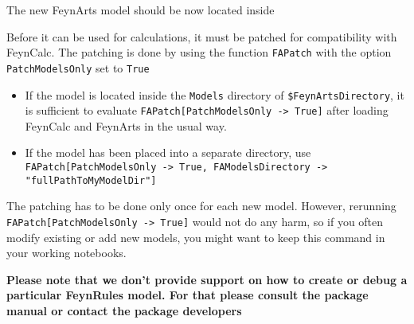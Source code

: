 \documentclass[../FeynCalcManual.tex]{subfiles}
\begin{document}
The new FeynArts model should be now located inside

\begin{Shaded}
\begin{Highlighting}[]
\OperatorTok{[\{}\OperatorTok{,}\OperatorTok{,}\OperatorTok{,}\OperatorTok{,}\OperatorTok{\}]}
\end{Highlighting}
\end{Shaded}

Before it can be used for calculations, it must be patched for
compatibility with FeynCalc. The patching is done by using the function
\texttt{FAPatch} with the option \texttt{PatchModelsOnly} set to
\texttt{True}

\begin{itemize}
\tightlist
\item
  If the model is located inside the \texttt{Models} directory of
  \texttt{\$FeynArtsDirectory}, it is sufficient to evaluate
  \texttt{FAPatch[\allowbreak{}PatchModelsOnly -> True]} after loading
  FeynCalc and FeynArts in the usual way.
\item
  If the model has been placed into a separate directory, use
  \texttt{FAPatch[\allowbreak{}PatchModelsOnly -> True,\ \allowbreak{}FAModelsDirectory -> "fullPathToMyModelDir"]}
\end{itemize}

The patching has to be done only once for each new model. However,
rerunning \texttt{FAPatch[\allowbreak{}PatchModelsOnly -> True]} would
not do any harm, so if you often modify existing or add new models, you
might want to keep this command in your working notebooks.

\textbf{Please note that we don't provide support on how to create or
debug a particular FeynRules model. For that please consult the package
manual or contact the package developers }
\end{document}
